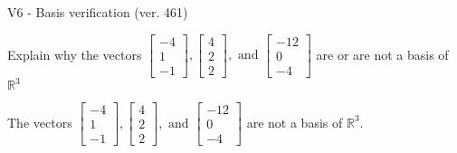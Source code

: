 \begin{exercise}
  \begin{exerciseTitle}V6 - Basis verification (ver. 461)\end{exerciseTitle}
  \begin{exerciseStatement}
    Explain why the vectors \(\left[\begin{array}{r}
-4 \\
1 \\
-1
\end{array}\right] , \left[\begin{array}{r}
4 \\
2 \\
2
\end{array}\right] , \text{ and } \left[\begin{array}{r}
-12 \\
0 \\
-4
\end{array}\right]\) are or are not a basis of \(\mathbb{R}^3\)	


  \end{exerciseStatement}
  \begin{exerciseAnswer}
   The vectors \(\left[\begin{array}{r}
-4 \\
1 \\
-1
\end{array}\right] , \left[\begin{array}{r}
4 \\
2 \\
2
\end{array}\right] , \text{ and } \left[\begin{array}{r}
-12 \\
0 \\
-4
\end{array}\right]\) 
  	 are not  a basis of \(\mathbb{R}^3\).
  


  \end{exerciseAnswer}
\end{exercise}